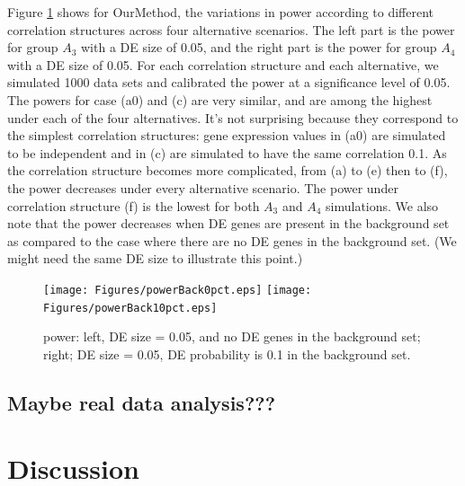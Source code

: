\documentclass[11pt, a4paper]{article}
\begin{document}
		Figure \ref{fig:power} shows for OurMethod, the variations in power according to different correlation structures across four alternative scenarios. The left part is the power for group $A_3$ with a DE size of 0.05, and the right part is the power for group $A_4$ with a DE size of 0.05. For each correlation structure and each alternative, we simulated 1000 data sets and calibrated the power at a significance level of 0.05. 
		The powers for case (a0) and (c) are very similar, and are among the highest under each of the four alternatives. It's not surprising because they correspond to the simplest correlation structures: gene expression values in (a0) are simulated to be independent and in (c) are simulated to have the same correlation 0.1. As the correlation structure becomes more complicated, from (a) to (e) then to (f), the power decreases under every alternative scenario. The power under correlation structure (f) is the lowest for both $A_3$ and $A_4$ simulations. We also note that the power decreases when DE genes are present in the background set as compared to the case where there are no DE genes in the background set. (We might need the same DE size to illustrate this point.)
		
			\begin{figure}[H]
				\caption{power: left, DE size = 0.05, and no DE genes in the background set; right; DE size = 0.05, DE probability is 0.1 in the background set.}\label{fig:power}
				\begin{center}
					\texttt{[image: Figures/powerBack0pct.eps]}
					\texttt{[image: Figures/powerBack10pct.eps]}
				\end{center} 
			\end{figure} 
		
		\subsection{Maybe real data analysis??? }
		
	\section{Discussion}
		 
\end{document}
